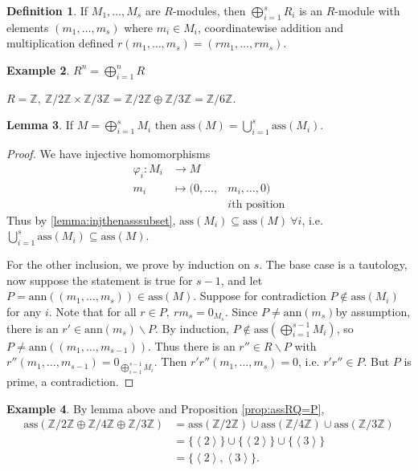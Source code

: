 \documentclass[a4paper]{article}
\newcommand{\la}{\left\langle}
\newcommand{\ra}{\right\rangle}
\newcommand{\Z}{\mathbb Z}
\newcommand{\ass}{\text{ass}}
\newcommand{\ann}{\text{ann}}
\theoremstyle{definition}
\newtheorem{defn}{Definition}[subsection]
\newtheorem{lemma}[defn]{Lemma}
\newtheorem{example}[defn]{Example}
\begin{document}
\begin{defn}
If $M_1,\ldots,M_s$ are $R$-modules, then $\bigoplus_{i=1}^s R_i$ is an $R$-module with elements $(m_1,\ldots,m_s)$ where $m_i\in M_i$, coordinatewise addition and multiplication defined $r(m_1,\ldots,m_s)=(rm_1,\ldots,rm_s)$.
\end{defn}
\begin{example}
$R^n=\bigoplus_{i=1}^n R$

$R=\Z,\ \Z/2\Z \times \Z/3\Z=\Z/2\Z \oplus \Z/3\Z=\Z/6\Z$.
\end{example}

\begin{lemma}
If $M=\bigoplus_{i=1}^s M_i$ then $\ass(M)=\bigcup_{i=1}^s \ass (M_i)$.
\end{lemma}
\begin{proof}
We have injective homomorphisms
\[
\begin{aligned}
\varphi_i:M_i&\rightarrow M\\
m_i&\mapsto(0,\ldots,&m_i,\ldots,0)\\
&&i\text{th position}
\end{aligned}
\]
Thus by \ref{lemma:injthenasssubset}, $\ass(M_i)\subseteq\ass(M) \ \forall i$, i.e. $\bigcup_{i=1}^s \ass (M_i)\subseteq \ass(M)$.

For the other inclusion, we prove by induction on $s$. The base case is a tautology, now suppose the statement is true for $s-1$, and let $P=\ann((m_1,\ldots,m_s))\in\ass(M)$. Suppose for contradiction $P\notin\ass(M_i)$ for any $i$. Note that for all $r\in P,\ rm_s=0_{M_s}$. Since $P\neq\ann(m_s)$by assumption, there is an $r'\in\ann(m_s)\backslash P$. By induction, $P\notin\ass\left(\bigoplus_{i=1}^{s-1} M_i\right)$, so $P\neq \ann((m_1,\ldots,m_{s-1}))$. Thus there is an $r''\in R\backslash P$ with $r''(m_1,\ldots,m_{s-1})=0_{\bigoplus_{i=1}^{s-1} M_i}$. Then $r'r''(m_1,\ldots,m_s)=0$, i.e. $r'r''\in P$. But $P$ is prime, a contradiction.
\end{proof}

\begin{example}
By lemma above and Proposition \ref{prop:assRQ=P},
\[
\begin{aligned}
\ass(\Z/2\Z\oplus\Z/4\Z\oplus\Z/3\Z)&=\ass(\Z/2\Z)\cup\ass(\Z/4\Z)\cup\ass(\Z/3\Z)\\
&=\{\la 2\ra\}\cup\{\la 2\ra\}\cup\{\la 3\ra\}\\
&=\{\la 2\ra,\la 3\ra\}.
\end{aligned}
\]
\end{example}
\end{document}
